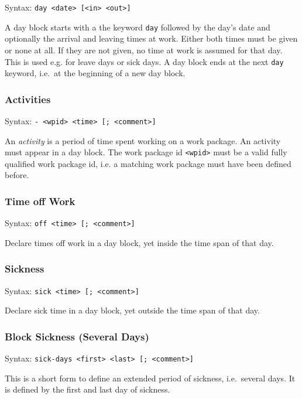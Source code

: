 \documentclass[11pt]{article}
\begin{document}
Syntax: \verb:day <date> [<in> <out>]:

A day block starts with a the keyword \verb:day: followed by the day's date and optionally the arrival and leaving times at work. Either both times must be given or none at all. If they are not given, no time at work is assumed for that day. This is used e.g. for leave days or sick days. A day block ends at the next \verb:day: keyword, i.e.\ at the beginning of a new day block.


\subsubsection{Activities}

Syntax: \verb:- <wpid> <time> [; <comment>]:

An \emph{activity} is a period of time spent working on a work package. An activity must appear in a day block. The work package id \verb:<wpid>: must be a valid fully qualified work package id, i.e. a matching work package must have been defined before.

\subsubsection{Time off Work}

Syntax: \verb:off <time> [; <comment>]:

Declare times off work in a day block, yet inside the time span of that day.
 
\subsubsection{Sickness}

Syntax: \verb:sick <time> [; <comment>]:

Declare sick time in a day block, yet outside the time span of that day.

\subsubsection{Block Sickness (Several Days)}

Syntax: \verb:sick-days <first> <last> [; <comment>]:

This is a short form to define an extended period of sickness, i.e.\ several days. It is defined by the first and last day of sickness.
\end{document}
